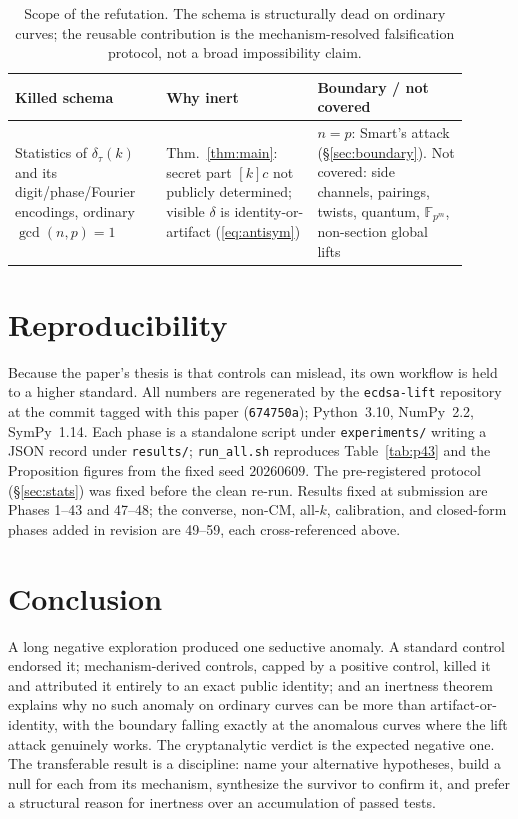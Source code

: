 \documentclass[11pt]{article}
\theoremstyle{definition}
\begin{document}
\begin{table}[t]
\centering
\small
\begin{tabular}{p{0.30\linewidth}p{0.30\linewidth}p{0.30\linewidth}}
\toprule
Killed schema & Why inert & Boundary / not covered\\
\midrule
Statistics of $\delta_\tau(k)$ and its digit/phase/Fourier encodings,
ordinary $\gcd(n,p)=1$ &
Thm.~\ref{thm:main}: secret part $[k]c$ not publicly determined; visible
$\delta$ is identity-or-artifact (\eqref{eq:antisym}) &
$n=p$: Smart's attack (\S\ref{sec:boundary}). Not covered: side
channels, pairings, twists, quantum, $\mathbb F_{p^m}$, non-section
global lifts\\
\bottomrule
\end{tabular}
\caption{Scope of the refutation. The schema is structurally dead on
ordinary curves; the reusable contribution is the mechanism-resolved
falsification protocol, not a broad impossibility claim.}
\label{tab:scope}
\end{table}

\section{Reproducibility}\label{sec:repro}

Because the paper's thesis is that controls can mislead, its own workflow
is held to a higher standard. All numbers are regenerated by the
\texttt{ecdsa-lift} repository at the commit tagged with this paper
(\texttt{674750a}); Python~3.10, NumPy~2.2, SymPy~1.14. Each phase is a
standalone script under \texttt{experiments/} writing a JSON record under
\texttt{results/}; \texttt{run\_all.sh} reproduces Table~\ref{tab:p43} and
the Proposition figures from the fixed seed $20260609$. The pre-registered
protocol (\S\ref{sec:stats}) was fixed before the clean re-run. Results
fixed at submission are Phases 1--43 and 47--48; the converse, non-CM,
all-$k$, calibration, and closed-form phases added in revision are
49--59, each cross-referenced above.

\section{Conclusion}

A long negative exploration produced one seductive anomaly. A standard
control endorsed it; mechanism-derived controls, capped by a positive
control, killed it and attributed it entirely to an exact public
identity; and an inertness theorem explains why no such anomaly on
ordinary curves can be more than artifact-or-identity, with the boundary
falling exactly at the anomalous curves where the lift attack genuinely
works. The cryptanalytic verdict is the expected negative one. The
transferable result is a discipline: name your alternative hypotheses,
build a null for each from its mechanism, synthesize the survivor to
confirm it, and prefer a structural reason for inertness over an
accumulation of passed tests.
\end{document}
